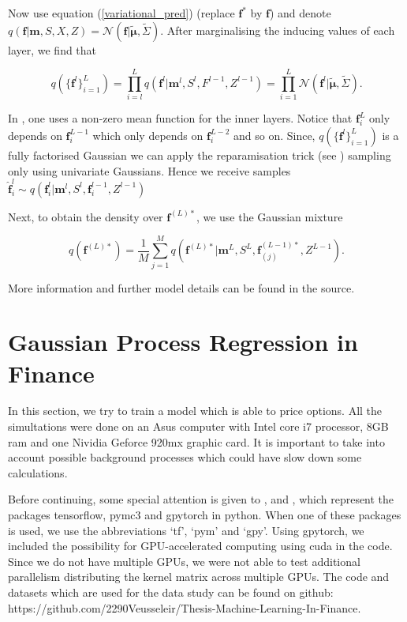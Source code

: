 \documentclass[12pt,a4paper,oneside]{book}
\begin{document}
Now use equation (\ref{variational_pred}) (replace $\bm{f}^{\ast}$ by $\bm{f}$) and denote $q(\bm{f}|\bm{m}, S,X,Z ) = \mathcal{N}(\bm{f}| \bm{\tilde{\mu}}, \tilde{\Sigma})$. After marginalising the inducing values of each layer, we find that

\begin{equation}
q (\{ \bm{f}^l \}_{i=1}^L) = \prod\limits_{i=l}^L q(\bm{f}^l | \bm{m}^l, S^l, F^{l-1}, Z^{l-1}) =  \prod\limits_{i=1}^L \mathcal{N}(\bm{f}^l | \bm{\tilde{\mu}} , \tilde{\Sigma}).
\end{equation}

In \cite{salimbeni2017doubly}, one uses a non-zero mean function for the inner layers. Notice that $\bm{f}^{L}_i$ only depends on $\bm{f}_i^{L-1}$ which only depends on $\bm{f}_i^{L-2}$ and so on. Since, $q (\{ \bm{f}^l \}_{i=1}^L)$ is a fully factorised Gaussian we can apply the reparamisation trick (see \cite{kingma2015variational}) sampling only using univariate Gaussians. Hence we receive samples $\hat{\bm{f}}_i^l \sim q(\bm{f}_i^l| \bm{m}^l, S^l, \bm{f}_i^{l-1} , Z^{l-1})$ 

Next, to obtain the density over $\bm{f}^{(L) {\ast}}$, we use the Gaussian mixture

\begin{equation}
q(\bm{f}^{(L) {\ast}}) = \dfrac{1}{M} \sum\limits_{j=1}^M q(\bm{f}^{(L) {\ast}} | \bm{m}^L, S^L, \bm{f}^{(L-1) \ast}_{(j)}, Z^{L-1}).
\end{equation}

More information and further model details can be found in the source.







\chapter{Gaussian Process Regression in Finance} \label{GPR_in finance}

In this section, we try to train a model which is able to price options. All the simultations were done on an Asus computer with Intel core i7 processor, 8GB ram and one Nividia Geforce 920mx graphic card. It is important to take into account possible background processes which could have slow down some calculations.

Before continuing, some special attention is given to  \cite{abadi2016tensorflow},  \cite{salvatier2016probabilistic} and \cite{gardner2018gpytorch}, which represent the packages tensorflow, pymc3 and gpytorch in python. When one of these packages is used, we use the abbreviations `tf', `pym' and `gpy'. Using gpytorch, we included the possibility for GPU-accelerated computing using cuda in the code. Since we do not have multiple GPUs, we were not able to test additional parallelism distributing the kernel matrix across multiple GPUs. The code and datasets which are used for the data study can be found on github: https://github.com/2290Veusseleir/Thesis-Machine-Learning-In-Finance. 
\end{document}
